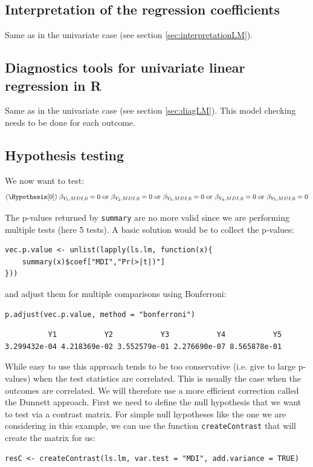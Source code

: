 \documentclass{article}
\newcommand\Rlogo{\textbf{\textsf{R}}}
\begin{document}
\subsection{Interpretation of the regression coefficients}
\label{sec:orgd45fd6e}

Same as in the univariate case (see section \ref{sec:interpretationLM}).

\subsection{Diagnostics tools for univariate linear regression in \Rlogo{}}
\label{sec:org4725676}

Same as in the univariate case (see section \ref{sec:diagLM}). This model
checking needs to be done for each outcome.

\subsection{Hypothesis testing}
\label{sec:org091446a}

We now want to test:
\begin{align*}
(\Hypothesis[0]) \; \beta_{Y_1, MDI, 0} = 0
 \text{ or } \beta_{Y_2, MDI, 0} = 0
 \text{ or } \beta_{Y_3, MDI, 0} = 0
 \text{ or } \beta_{Y_4, MDI, 0} = 0
 \text{ or } \beta_{Y_5, MDI, 0} = 0
\end{align*}

The p-values returned by \texttt{summary} are no more valid since we are
performing multiple tests (here 5 tests). A basic solution would be to
collect the p-values:
\lstset{language=r,label= ,caption= ,captionpos=b,numbers=none}
\begin{lstlisting}
vec.p.value <- unlist(lapply(ls.lm, function(x){
    summary(x)$coef["MDI","Pr(>|t|)"]
}))
\end{lstlisting}

and adjust them for multiple comparisons using Bonferroni:
\lstset{language=r,label= ,caption= ,captionpos=b,numbers=none}
\begin{lstlisting}
p.adjust(vec.p.value, method = "bonferroni")
\end{lstlisting}

\begin{verbatim}
          Y1           Y2           Y3           Y4           Y5 
3.299432e-04 4.218369e-02 3.552579e-01 2.276690e-07 8.565878e-01
\end{verbatim}

While easy to use this approach tends to be too conservative
(i.e. give to large p-values) when the test statistics are
correlated. This is usually the case when the outcomes are
correlated. We will therefore use a more efficient correction called
the Dunnett approach. First we need to define the null hypothesis
that we want to test via a contrast matrix. For simple null hypotheses
like the one we are considering in this example, we can use the
function \texttt{createContrast} that will create the matrix for us:
\lstset{language=r,label= ,caption= ,captionpos=b,numbers=none}
\begin{lstlisting}
resC <- createContrast(ls.lm, var.test = "MDI", add.variance = TRUE)
\end{lstlisting}
\end{document}
